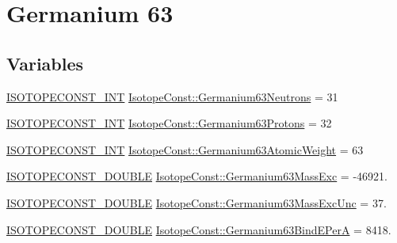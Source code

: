 \hypertarget{group___isotope_const-_germanium-_ge63}{}\section{Germanium 63}
\label{group___isotope_const-_germanium-_ge63}
\subsection*{Variables}
\begin{DoxyCompactItemize}
\item 
\mbox{\hyperlink{group___isotope_const-_macros_ga5f18360b3e99483a35c32d789e62621c}{I\+S\+O\+T\+O\+P\+E\+C\+O\+N\+S\+T\+\_\+\+I\+NT}} \mbox{\hyperlink{group___isotope_const-_germanium-_ge63_ga6315f141d371d2ea604ee43edb05c72a}{Isotope\+Const\+::\+Germanium63\+Neutrons}} = 31
\item 
\mbox{\hyperlink{group___isotope_const-_macros_ga5f18360b3e99483a35c32d789e62621c}{I\+S\+O\+T\+O\+P\+E\+C\+O\+N\+S\+T\+\_\+\+I\+NT}} \mbox{\hyperlink{group___isotope_const-_germanium-_ge63_gab485852c64e300f2068cba68ffced4aa}{Isotope\+Const\+::\+Germanium63\+Protons}} = 32
\item 
\mbox{\hyperlink{group___isotope_const-_macros_ga5f18360b3e99483a35c32d789e62621c}{I\+S\+O\+T\+O\+P\+E\+C\+O\+N\+S\+T\+\_\+\+I\+NT}} \mbox{\hyperlink{group___isotope_const-_germanium-_ge63_gac2fa1462d7116383885e8cf45a5171f7}{Isotope\+Const\+::\+Germanium63\+Atomic\+Weight}} = 63
\item 
\mbox{\hyperlink{group___isotope_const-_macros_ga8f45a7272ce02c0b4c65c44636ed719a}{I\+S\+O\+T\+O\+P\+E\+C\+O\+N\+S\+T\+\_\+\+D\+O\+U\+B\+LE}} \mbox{\hyperlink{group___isotope_const-_germanium-_ge63_ga8d404e4c70f7060628222bde23159717}{Isotope\+Const\+::\+Germanium63\+Mass\+Exc}} = -\/46921.
\item 
\mbox{\hyperlink{group___isotope_const-_macros_ga8f45a7272ce02c0b4c65c44636ed719a}{I\+S\+O\+T\+O\+P\+E\+C\+O\+N\+S\+T\+\_\+\+D\+O\+U\+B\+LE}} \mbox{\hyperlink{group___isotope_const-_germanium-_ge63_gadd295f1684f13edceb437cbd9bac2a1c}{Isotope\+Const\+::\+Germanium63\+Mass\+Exc\+Unc}} = 37.
\item 
\mbox{\hyperlink{group___isotope_const-_macros_ga8f45a7272ce02c0b4c65c44636ed719a}{I\+S\+O\+T\+O\+P\+E\+C\+O\+N\+S\+T\+\_\+\+D\+O\+U\+B\+LE}} \mbox{\hyperlink{group___isotope_const-_germanium-_ge63_ga01db8930d7c38a3d3604a80aac2ac4e9}{Isotope\+Const\+::\+Germanium63\+Bind\+E\+PerA}} = 8418.
\item 

\end{DoxyCompactItemize}
